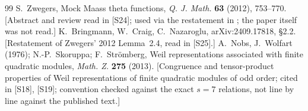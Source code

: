 \documentclass[11pt]{article}
\theoremstyle{definition}
\newcommand{\src}[1]{\textup{[S#1]}}
\begin{document}
\begin{thebibliography}{99}
 S.~Zwegers, Mock Maass theta functions, \emph{Q. J. Math.} \textbf{63} (2012), 753--770. [Abstract and review read in \src{24}; used via the restatement in \cite{BCN}; the paper itself was not read.]
 K.~Bringmann, W.~Craig, C.~Nazaroglu, arXiv:2409.17818, \S2.2. [Restatement of Zwegers' 2012 Lemma~2.4, read in \src{25}.]
 A.~Nobs, J.~Wolfart (1976); N.-P.~Skoruppa; F.~Str\"omberg, Weil representations associated with finite quadratic modules, \emph{Math. Z.} \textbf{275} (2013). [Congruence and tensor-product properties of Weil representations of finite quadratic modules of odd order; cited in \src{18}, \src{19}; convention checked against the exact $s=7$ relations, not line by line against the published text.]
\end{thebibliography}
\end{document}
